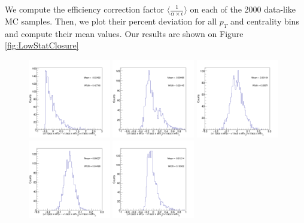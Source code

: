 We compute the efficiency correction factor $\langle \frac{1}{\alpha \times \epsilon}\rangle$ on each of the 2000 data-like MC samples. Then, we plot their percent deviation for all $p_T$ and centrality bins and compute their mean values. Our results are shown on Figure \ref{fig:LowStatClosure}

\begin{figure}[h]
\begin{center}
\includegraphics[width= 0.32\textwidth]{Figures/Chapter4/BsEffONLY_0_90_0.png}
\includegraphics[width= 0.32\textwidth]{Figures/Chapter4/BsEffONLY_0_90_1.png}
\includegraphics[width= 0.32\textwidth]{Figures/Chapter4/BsEffONLY_0_90_2.png}
\includegraphics[width= 0.32\textwidth]{Figures/Chapter4/BsEffONLY_0_90_3.png}
\includegraphics[width= 0.32\textwidth]{Figures/Chapter4/BsEffONLY_0_30_-1.png}

\end{center}
\end{figure}
